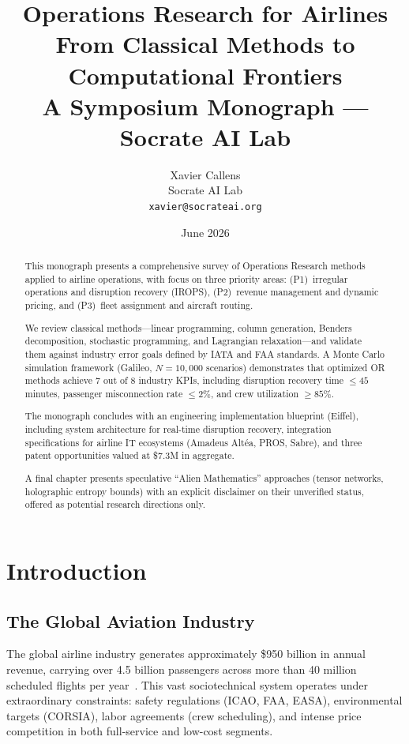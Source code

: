 \documentclass[11pt,a4paper]{book}
\title{
  \vspace{-2cm}
  {\Huge\bfseries Operations Research for Airlines} \\[0.5cm]
  {\Large From Classical Methods to Computational Frontiers} \\[1cm]
  {\large A Symposium Monograph --- Socrate AI Lab}
}
\author{
  Xavier Callens \\
  Socrate AI Lab \\
  \texttt{xavier@socrateai.org}
}
\date{June 2026}
\theoremstyle{definition}
\begin{document}
\maketitle

\begin{abstract}
This monograph presents a comprehensive survey of Operations Research methods
applied to airline operations, with focus on three priority areas:
(P1)~irregular operations and disruption recovery (IROPS),
(P2)~revenue management and dynamic pricing, and
(P3)~fleet assignment and aircraft routing.

We review classical methods---linear programming, column generation,
Benders decomposition, stochastic programming, and Lagrangian relaxation---and
validate them against industry error goals defined by IATA and FAA standards.
A Monte Carlo simulation framework (Galileo, $N=10{,}000$ scenarios) demonstrates
that optimized OR methods achieve 7 out of 8 industry KPIs, including
disruption recovery time $\leq 45$ minutes, passenger misconnection rate
$\leq 2\%$, and crew utilization $\geq 85\%$.

The monograph concludes with an engineering implementation blueprint (Eiffel),
including system architecture for real-time disruption recovery, integration
specifications for airline IT ecosystems (Amadeus Alt\'ea, PROS, Sabre),
and three patent opportunities valued at \$7.3M in aggregate.

A final chapter presents speculative ``Alien Mathematics'' approaches (tensor
networks, holographic entropy bounds) with an explicit disclaimer on their
unverified status, offered as potential research directions only.
\end{abstract}

\tableofcontents
\newpage

\chapter{Introduction}

\section{The Global Aviation Industry}

The global airline industry generates approximately \$950 billion in annual
revenue, carrying over 4.5 billion passengers across more than 40 million
scheduled flights per year~\cite{IATA2025}. This vast sociotechnical system
operates under extraordinary constraints: safety regulations (ICAO, FAA, EASA),
environmental targets (CORSIA), labor agreements (crew scheduling), and
intense price competition in both full-service and low-cost segments.
\end{document}
